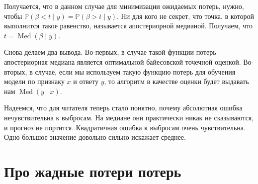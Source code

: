 \documentclass[12pt, a4paper, oneside]{extreport}
\DeclareMathOperator{\Med}{Med}
\def \b{\beta}
\def \mbb{\mathbb}
\def \PP{\mbb{P}}
\newcommand{\dx}[1]{\,\mathrm{d}#1} %
\theoremstyle{plain}              %
\theoremstyle{definition}         %
\begin{document}
Получается, что в данном случае для минимизации ожидаемых потерь, нужно, чтобы $\PP(\beta < t \mid y) = \PP(\beta > t \mid y)$. Ни для кого не секрет, что точка, в которой выполнится такое равенство, называется апостериорной медианой. Получаем, что $t = \Med(\beta \mid y)$. 

Снова делаем два вывода. Во-первых, в случае такой функции потерь апостериорная медиана является оптимальной байесовской точечной оценкой. Во-вторых, в случае, если мы используем такую функцию потерь для обучения модели по признаку $x$ и ответу $y$, то алгоритм в качестве оценки будет выдавать нам $\Med(y \mid x)$.  

Надеемся, что для читателя теперь стало понятно, почему абсолютная ошибка нечувствительна к выбросам. На медиане они практически никак не сказываются, и прогноз не портится. Квадратичная ошибка к выбросам очень чувствительна. Одно большое значение довольно сильно искажает среднее.

\section{Про жадные потери потерь} 

%




\end{document}
